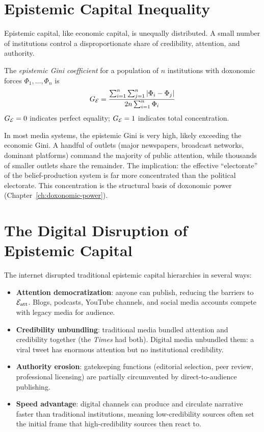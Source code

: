 \section{Epistemic Capital Inequality}
\label{sec:ch6-inequality}

Epistemic capital, like economic capital, is unequally distributed.
A small number of institutions control a disproportionate share of credibility, attention, and authority.

\begin{definition}
\label{def:epistemic-gini}
The \emph{epistemic Gini coefficient} for a population of $n$ institutions with doxonomic forces $\Phi_1, \ldots, \Phi_n$ is
\[
  G_{\mathcal{E}} = \frac{\sum_{i=1}^{n}\sum_{j=1}^{n} |\Phi_i - \Phi_j|}{2n\sum_{i=1}^{n}\Phi_i}
\]
$G_{\mathcal{E}} = 0$ indicates perfect equality; $G_{\mathcal{E}} = 1$ indicates total concentration.
\end{definition}

\begin{remark}
In most media systems, the epistemic Gini is very high, likely exceeding the economic Gini.
A handful of outlets (major newspapers, broadcast networks, dominant platforms) command the majority of public attention, while thousands of smaller outlets share the remainder.
The implication: the effective ``electorate'' of the belief-production system is far more concentrated than the political electorate.
This concentration is the structural basis of doxonomic power (Chapter~\ref{ch:doxonomic-power}).
\end{remark}


\section{The Digital Disruption of Epistemic Capital}
\label{sec:ch6-digital}

The internet disrupted traditional epistemic capital hierarchies in several ways:

\begin{itemize}[nosep]
  \item \textbf{Attention democratization}: anyone can publish, reducing the barriers to $\mathcal{E}_{\text{att}}$.
  Blogs, podcasts, YouTube channels, and social media accounts compete with legacy media for audience.
  \item \textbf{Credibility unbundling}: traditional media bundled attention and credibility together (the \textit{Times} had both).
  Digital media unbundled them: a viral tweet has enormous attention but no institutional credibility.
  \item \textbf{Authority erosion}: gatekeeping functions (editorial selection, peer review, professional licensing) are partially circumvented by direct-to-audience publishing.
  \item \textbf{Speed advantage}: digital channels can produce and circulate narrative faster than traditional institutions, meaning low-credibility sources often set the initial frame that high-credibility sources then react to.
\end{itemize}

